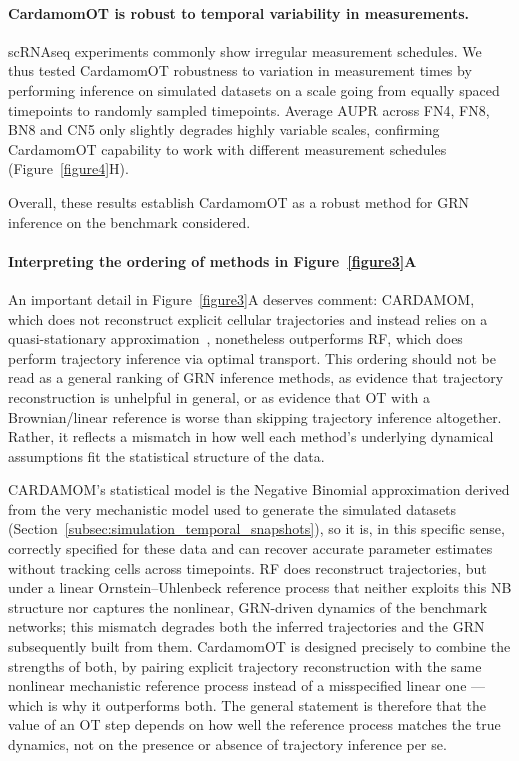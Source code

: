 \documentclass[a4paper, 11pt]{article}
\theoremstyle{plain}
\theoremstyle{remark}
\newcommand*{\firstreview}[1]{{\color{black}#1}}
\begin{document}
\firstreview{
\paragraph{CardamomOT is robust to temporal variability in measurements.}
scRNAseq experiments commonly show irregular measurement schedules. We thus tested CardamomOT robustness to variation in measurement times by performing inference on simulated datasets on a scale going from equally spaced timepoints to randomly sampled timepoints. Average AUPR across FN4, FN8, BN8 and CN5 only slightly degrades highly variable scales, confirming CardamomOT capability to work with different measurement schedules (Figure~\ref{figure4}H). 
}

Overall, \firstreview{these results establish CardamomOT as a robust method for GRN inference on the benchmark considered.}

\firstreview{\paragraph{Interpreting the ordering of methods in Figure~\ref{figure3}A}
An important detail in Figure~\ref{figure3}A deserves comment: CARDAMOM, which does not
reconstruct explicit cellular trajectories and instead relies on a quasi-stationary
approximation~\cite{ventre2023one}, nonetheless outperforms RF, which does perform trajectory
inference via optimal transport. This ordering should not be read as a general ranking of GRN
inference methods, as evidence that trajectory reconstruction is unhelpful in general, or as
evidence that OT with a Brownian/linear reference is worse than skipping trajectory inference
altogether. Rather, it reflects a mismatch in how well each method's underlying dynamical
assumptions fit the statistical structure of the data.}

\firstreview{CARDAMOM's statistical model is the Negative Binomial approximation derived from the}
very mechanistic model used to generate the simulated datasets
(Section~\ref{subsec:simulation_temporal_snapshots}), so it is, in this specific sense, correctly
specified for these data and can recover accurate parameter estimates without tracking cells
across timepoints. RF does reconstruct trajectories, but under a linear Ornstein--Uhlenbeck
reference process that neither exploits this NB structure nor captures the nonlinear, GRN-driven
dynamics of the benchmark networks; this mismatch degrades both the inferred trajectories and the
GRN subsequently built from them. CardamomOT is designed precisely to combine the strengths of
both, by pairing explicit trajectory reconstruction with the same nonlinear mechanistic reference
process instead of a misspecified linear one --- which is why it outperforms both. The general
statement is therefore that the value of an OT step depends on how well the reference process
matches the true dynamics, not on the presence or absence of trajectory inference per se.
\end{document}
